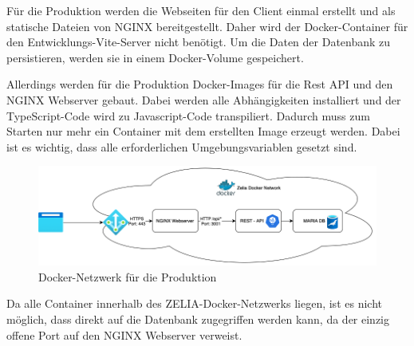 
Für die Produktion werden die Webseiten für den Client einmal erstellt und als statische Dateien von NGINX bereitgestellt. 
Daher wird der Docker-Container für den Entwicklungs-Vite-Server nicht benötigt. 
Um die Daten der Datenbank zu persistieren, werden sie in einem Docker-Volume gespeichert. 

Allerdings werden für die Produktion Docker-Images für die Rest API und den NGINX Webserver gebaut. Dabei werden alle Abhängigkeiten installiert und der TypeScript-Code wird zu Javascript-Code transpiliert. Dadurch muss zum Starten nur mehr ein Container mit dem erstellten Image erzeugt werden. 
Dabei ist es wichtig, dass alle erforderlichen Umgebungsvariablen gesetzt sind.

\begin{figure}[H]
    \centering
    \includegraphics{media/Docker/ProdNetwork.png}
    \caption{Docker-Netzwerk für die Produktion}
\end{figure}

Da alle Container innerhalb des ZELIA-Docker-Netzwerks liegen, ist es nicht möglich, dass direkt auf die Datenbank zugegriffen werden kann, da der einzig offene Port auf den NGINX Webserver verweist. 


